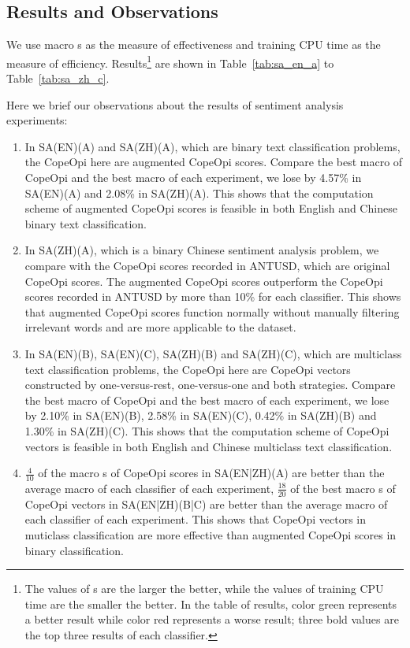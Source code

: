 \subsection{Results and Observations}
\par We use macro \fscore{}s as the measure of effectiveness and training CPU time as the measure of efficiency. Results\footnote{The values of \fscore{}s are the larger the better, while the values of training CPU time are the smaller the better. In the table of results, color green represents a better result while color red represents a worse result; three bold values are the top three results of each classifier.} are shown in Table~\ref{tab:sa_en_a} to Table~\ref{tab:sa_zh_c}.
\par Here we brief our observations about the results of sentiment analysis experiments:
\begin{enumerate}
\item In SA(EN)(A) and SA(ZH)(A),
which are binary text classification problems, the CopeOpi here are augmented CopeOpi scores.
Compare the best macro \fscore{} of CopeOpi and the best macro \fscore{} of each experiment, we lose by
4.57\% in SA(EN)(A) and 2.08\% in SA(ZH)(A).
This shows that the computation scheme of augmented CopeOpi scores is feasible in both English and Chinese binary text classification.
\item In SA(ZH)(A),
which is a binary Chinese sentiment analysis problem, we compare with the CopeOpi scores recorded in ANTUSD\cite{wang2006antusd}, which are original CopeOpi scores.
The augmented CopeOpi scores outperform the CopeOpi scores recorded in ANTUSD by more than 10\% for each classifier.
This shows that augmented CopeOpi scores function normally without manually filtering irrelevant words and are more applicable to the dataset.
\item In SA(EN)(B), SA(EN)(C), SA(ZH)(B) and SA(ZH)(C),
which are multiclass text classification problems, the CopeOpi here are CopeOpi vectors constructed by one-versus-rest, one-versus-one and both strategies.
Compare the best macro \fscore{} of CopeOpi and the best macro \fscore{} of each experiment, we lose by
2.10\% in SA(EN)(B), 2.58\% in SA(EN)(C), 0.42\% in SA(ZH)(B) and 1.30\% in SA(ZH)(C).
This shows that the computation scheme of CopeOpi vectors is feasible in both English and Chinese multiclass text classification.
\item
$\frac{4}{10}$ of the macro \fscore{}s of CopeOpi scores in SA(EN|ZH)(A) are better than the average macro \fscore{} of each classifier of each experiment,
$\frac{18}{20}$ of the best macro \fscore{}s of CopeOpi vectors in SA(EN|ZH)(B|C) are better than the average macro \fscore{} of each classifier of each experiment.
This shows that CopeOpi vectors in muticlass classification are more effective than augmented CopeOpi scores in binary classification.
\end{enumerate}

